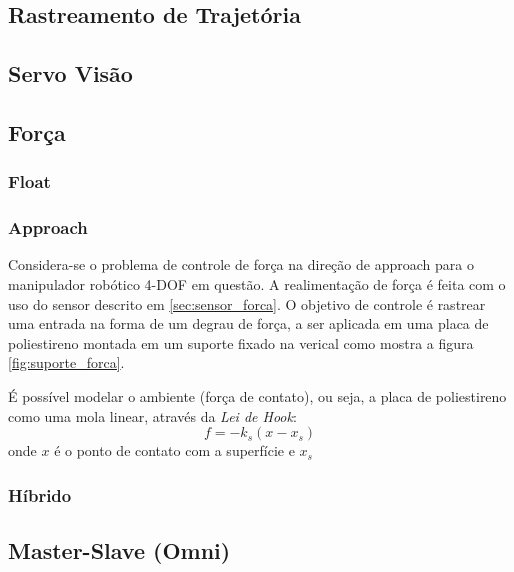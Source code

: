 \subsection{Rastreamento de Trajetória}
\subsection{Servo Visão}
\subsection{Força}
\subsubsection{Float}
\subsubsection{Approach}
Considera-se o problema de controle de força na direção de approach para o manipulador robótico 4-DOF em questão. A realimentação de força é feita com o uso do sensor descrito em \ref{sec:sensor_forca}. O objetivo de controle é rastrear uma entrada na forma de um degrau de força, a ser aplicada em uma placa de poliestireno montada em um suporte fixado na verical como mostra a figura \ref{fig:suporte_forca}.  

É possível modelar o ambiente (força de contato), ou seja, a placa de poliestireno como uma mola linear, através da \textit{Lei de Hook}: \cite{bib:toni}
\begin{equation}
f = -k_s (x - x_s)
\end{equation}
onde $x$ é o ponto de contato com a superfície e $x_s$
\subsubsection{Híbrido}
\subsection{Master-Slave (Omni)}